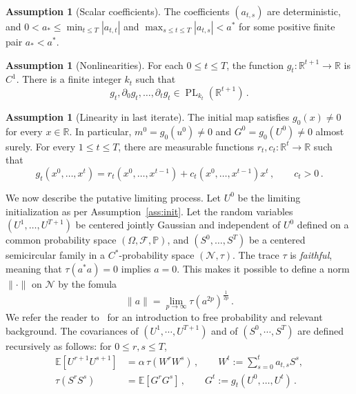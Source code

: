 \documentclass[11pt]{article}
\theoremstyle{definition}
\newtheorem{assumption}[theorem]{Assumption}
\theoremstyle{remark}
\numberwithin{equation}{section}
\numberwithin{theorem}{section}
\newcommand{\R}{\mathbb R}
\newcommand{\E}{\mathbb E}
\newcommand{\Prob}{\mathbb P}
\newcommand{\taup}{\tau}
\newcommand{\PL}{\operatorname{PL}}
\begin{document}
\begin{assumption}[Scalar coefficients]\label{ass:a1}
The coefficients $(a_{t,s})$ are deterministic, and $0 <a_* \le \min_{t \le T} |a_{t,t}|$ and  $ \max_{s \le t\le T} |a_{t,s}| < a^*$ for some positive finite pair $a_*<a^*$. 
\end{assumption}


\begin{assumption}[Nonlinearities]\label{ass:g}
For each $0\le t\le T$, the function
$g_t:\R^{t+1}\to\R$ is $C^1$.  There is a finite integer
$k_t$ such that
\[
 g_t,\partial_0g_t,\ldots,\partial_tg_t
 \in \PL_{k_t}(\R^{t+1})\,.
\]
\end{assumption}

\begin{assumption}[Linearity in last iterate]
\label{ass:transversality}
The initial map satisfies $g_0(x)\ne 0$ for every $x\in\R$.  In
particular, $m^0=g_0(u^0)\ne0$ and $G^0=g_0(U^0)\ne0$ almost surely.
For every $1\le t\le T$, there are measurable functions
$r_t,c_t:\R^t\to\R$ such that
\begin{equation}\label{eq:transverse-form}
 g_t(x^0,\ldots,x^t)
 =r_t(x^0,\ldots,x^{t-1})
  +c_t(x^0,\ldots,x^{t-1})x^t\,,
 \qquad c_t>0\,.
\end{equation}
\end{assumption}

We now describe the putative limiting process.
Let $U^0$ be the limiting initialization as per Assumption~\ref{ass:init}.  
Let the random variables $(U^1,\ldots,U^{T+1})$ be centered jointly Gaussian and independent of $U^0$ defined on a common probability space $(\Omega,\mathcal{F},\Prob)$,  and $(S^0,\ldots,S^T)$ be a centered semicircular family in a $C^*$-probability space $(\mathcal N,\tau)$. The trace $\tau$ is \emph{faithful}, meaning that $\tau(a^*a)=0$ implies $a=0$. This makes it possible to define a norm $\|\cdot\|$ on $\mathcal N$ by the fomula
\begin{equation}\label{eq:norm_N}
\|a\| = \lim_{p \to \infty} \tau(a^{2p})^{\frac{1}{2p}}\,.
\end{equation}
We refer the reader to~\cite{mingo2017free} for an introduction to free probability and relevant background.  
The covariances of $(U^1,\cdots,U^{T+1})$ and of $(S^0,\cdots,S^T)$ are defined recursively as follows: for $0\le r,s\le T$,
\begin{align}
\E[U^{r+1}U^{s+1}] &= \alpha\,\taup(W^rW^s)\,,
  \qquad W^t:=\sum_{s=0}^{t} a_{t,s}S^s,\label{eq:covU}\\
  \taup(S^rS^s) &= \E[G^rG^s]\,,
  \qquad G^t:=g_t(U^0,\ldots,U^t)\,.\label{eq:covS}
\end{align}
\end{document}
